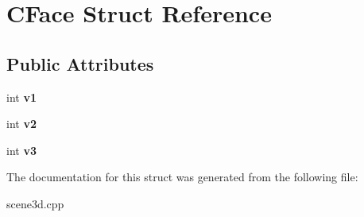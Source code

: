 \hypertarget{struct_c_face}{}\section{C\+Face Struct Reference}
\label{struct_c_face}
\subsection*{Public Attributes}
\begin{DoxyCompactItemize}
\item 
\mbox{\label{struct_c_face_a14106e79e385336b4a5de33318cabce5}} 
int {\bfseries v1}
\item 
\mbox{\label{struct_c_face_a24d020a77049248bf2de33f5d2e615e5}} 
int {\bfseries v2}
\item 
\mbox{\label{struct_c_face_afa15bb605b7e7915add1da1455e37918}} 
int {\bfseries v3}
\end{DoxyCompactItemize}


The documentation for this struct was generated from the following file\+:\begin{DoxyCompactItemize}
\item 
scene3d.\+cpp\end{DoxyCompactItemize}
